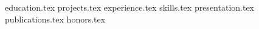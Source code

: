 \documentclass[11pt, a4paper]{awesome-cv}
\newcommand*{\sectiondir}{resume/}
\begin{document}
\makecvheader


{education.tex}
{projects.tex}
{experience.tex}
\newpage
{skills.tex}
{presentation.tex}
{publications.tex}
{honors.tex}
\end{document}
